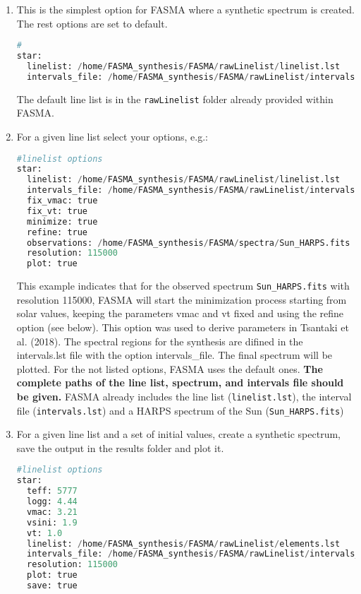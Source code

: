 \documentclass[a4paper,12pt]{article}
\begin{document}
\begin{enumerate}

 \item This is the simplest option for FASMA where a synthetic spectrum is created. The rest options are set to default.
 {\footnotesize
 \begin{lstlisting}[language=Python]
#
star:
  linelist: /home/FASMA_synthesis/FASMA/rawLinelist/linelist.lst
  intervals_file: /home/FASMA_synthesis/FASMA/rawLinelist/intervals.lst
\end{lstlisting}
}

The default line list is in the \texttt{rawLinelist} folder already provided within FASMA.
 \item For a given line list select your options, e.g.:
 {\footnotesize
 \begin{lstlisting}[language=Python]
 #linelist options
star:
  linelist: /home/FASMA_synthesis/FASMA/rawLinelist/linelist.lst
  intervals_file: /home/FASMA_synthesis/FASMA/rawLinelist/intervals.lst
  fix_vmac: true
  fix_vt: true
  minimize: true
  refine: true
  observations: /home/FASMA_synthesis/FASMA/spectra/Sun_HARPS.fits
  resolution: 115000
  plot: true
\end{lstlisting}}

This example indicates that for the observed spectrum \texttt{Sun\_HARPS.fits} with resolution 115000, FASMA will start the minimization process starting from solar values, keeping the 
parameters vmac and vt fixed and using the refine option (see below). This option was used to derive parameters in Tsantaki et al. (2018). The spectral regions for the synthesis are 
difined in the intervals.lst file with the option intervals\_file. The final spectrum will be plotted. For the not listed options, FASMA uses the default ones. {\bf The complete paths 
of the line list, spectrum, and intervals file should be given.} FASMA already includes the line list (\texttt{linelist.lst}), the interval file (\texttt{intervals.lst}) and a HARPS 
spectrum of the Sun (\texttt{Sun\_HARPS.fits})

 \item For a given line list and a set of initial values, create a synthetic spectrum, save the output in the results folder and plot it. 
 {\footnotesize

\begin{lstlisting}[language=Python]
 #linelist options
star:
  teff: 5777
  logg: 4.44
  vmac: 3.21
  vsini: 1.9
  vt: 1.0
  linelist: /home/FASMA_synthesis/FASMA/rawLinelist/elements.lst
  intervals_file: /home/FASMA_synthesis/FASMA/rawLinelist/intervals_elements.lst.lst
  resolution: 115000
  plot: true
  save: true
\end{lstlisting}}


\end{enumerate}
\end{document}
